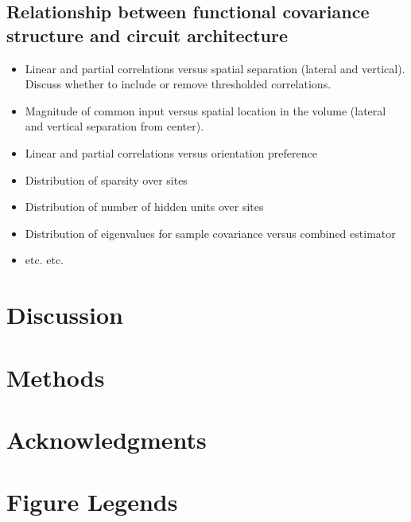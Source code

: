 \documentclass[10pt]{article}
\begin{document}
\subsection*{Relationship between functional covariance structure and circuit architecture}

\begin{itemize}
\item Linear and partial correlations versus spatial separation (lateral and vertical). Discuss whether to include or remove thresholded correlations.
\item Magnitude of common input versus spatial location in the volume (lateral and vertical separation from center).
\item Linear and partial correlations versus orientation preference
\item Distribution of sparsity over sites
\item Distribution of number of hidden units over sites
\item Distribution of eigenvalues for sample covariance versus combined estimator
\item etc. etc. 

\end{itemize}







\section*{Discussion}

\section*{Methods}

\section*{Acknowledgments}




\section*{Figure Legends}
\end{document}
